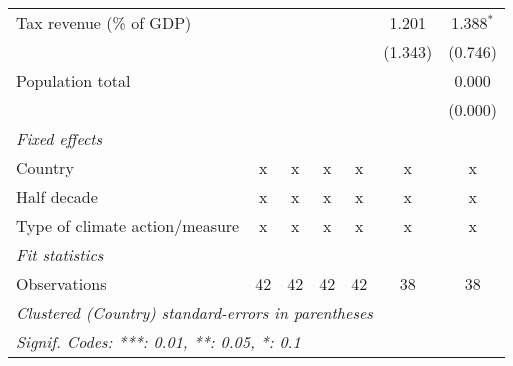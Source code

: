 \begin{tabular}{lcccccc}
   Tax revenue (\% of GDP)                      &              &          &               &               & 1.201     & 1.388$^{*}$\\   
                                                &              &          &               &               & (1.343)   & (0.746)\\   
   Population total                             &              &          &               &               &           & 0.000\\   
                                                &              &          &               &               &           & (0.000)\\   
   \emph{Fixed effects}\\
   Country                                      & x            & x        & x             & x             & x         & x\\  
   Half decade                                  & x            & x        & x             & x             & x         & x\\  
   Type of climate action/measure               & x            & x        & x             & x             & x         & x\\  
   \midrule \emph{Fit statistics}\\
   Observations                                 & 42           & 42       & 42            & 42            & 38        & 38\\  
   \midrule
   \multicolumn{7}{l}{\emph{Clustered (Country) standard-errors in parentheses}}\\
   \multicolumn{7}{l}{\emph{Signif. Codes: ***: 0.01, **: 0.05, *: 0.1}}\\
\end{tabular}
\par\endgroup


